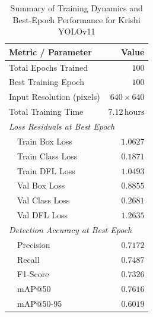 \documentclass{article}
\begin{document}
\begin{table}[htbp]
  \centering
  \caption{Summary of Training Dynamics and Best-Epoch Performance for Krishi YOLOv11}
  \label{tab:training_dynamics_summary}
  \begin{tabular}{lr}
    \toprule
    \textbf{Metric / Parameter} & \textbf{Value} \\
    \midrule
    Total Epochs Trained & $100$ \\
    Best Training Epoch & $100$ \\
    Input Resolution (pixels) & $640 \times 640$ \\
    Total Training Time & $7.12\,\text{hours}$ \\
    \midrule
    \multicolumn{2}{l}{\textit{Loss Residuals at Best Epoch}} \\
    ~~Train Box Loss & $1.0627$ \\
    ~~Train Class Loss & $0.1871$ \\
    ~~Train DFL Loss & $1.0493$ \\
    ~~Val Box Loss & $0.8855$ \\
    ~~Val Class Loss & $0.2681$ \\
    ~~Val DFL Loss & $1.2635$ \\
    \midrule
    \multicolumn{2}{l}{\textit{Detection Accuracy at Best Epoch}} \\
    ~~Precision & $0.7172$ \\
    ~~Recall & $0.7487$ \\
    ~~F1-Score & $0.7326$ \\
    ~~mAP@50 & $0.7616$ \\
    ~~mAP@50-95 & $0.6019$ \\
    \bottomrule
  \end{tabular}
\end{table}
\end{document}
